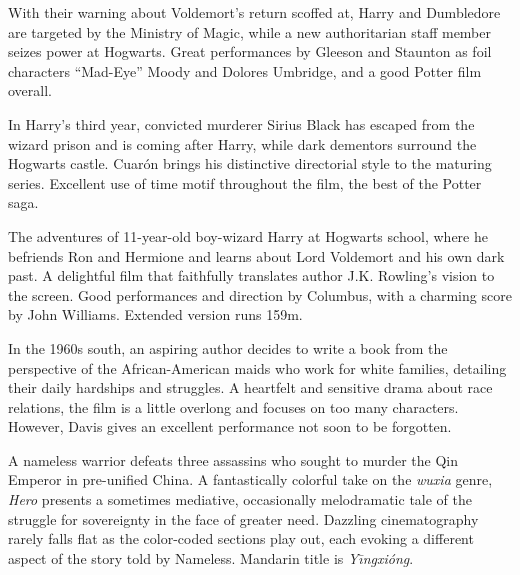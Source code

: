    With their warning about Voldemort's return scoffed at, Harry and Dumbledore are targeted by the Ministry of Magic, while a new authoritarian staff member seizes power at Hogwarts. Great performances by Gleeson and Staunton as foil characters ``Mad-Eye'' Moody and Dolores Umbridge, and a good Potter film overall. \author{DW} 

   In Harry's third year, convicted murderer Sirius Black has escaped from the wizard prison and is coming after Harry, while dark dementors surround the Hogwarts castle. Cuar\'on brings his distinctive directorial style to the maturing series. Excellent use of time motif throughout the film, the best of the Potter saga. \author{DW} 

   The adventures of 11-year-old boy-wizard Harry at Hogwarts school, where he befriends Ron and Hermione and learns about Lord Voldemort and his own dark past. A delightful film that faithfully translates author J.K. Rowling's vision to the screen. Good performances and direction by Columbus, with a charming score by John Williams. Extended version runs 159m. \author{DW} 

   In the 1960s south, an aspiring author decides to write a book from the perspective of the African-American maids who work for white families, detailing their daily hardships and struggles. A heartfelt and sensitive drama about race relations, the film is a little overlong and focuses on too many characters. However, Davis gives an excellent performance not soon to be forgotten. \author{DW} 

   A nameless warrior defeats three assassins who sought to murder the Qin Emperor in pre-unified China. A fantastically colorful take on the \textit{wuxia} genre, \textit{Hero} presents a sometimes mediative, occasionally melodramatic tale of the struggle for sovereignty in the face of greater need. Dazzling cinematography rarely falls flat as the color-coded sections play out, each evoking a different aspect of the story told by Nameless. Mandarin title is \textit{Y\=\i ngxi\'ong}. \author{JDT} 

